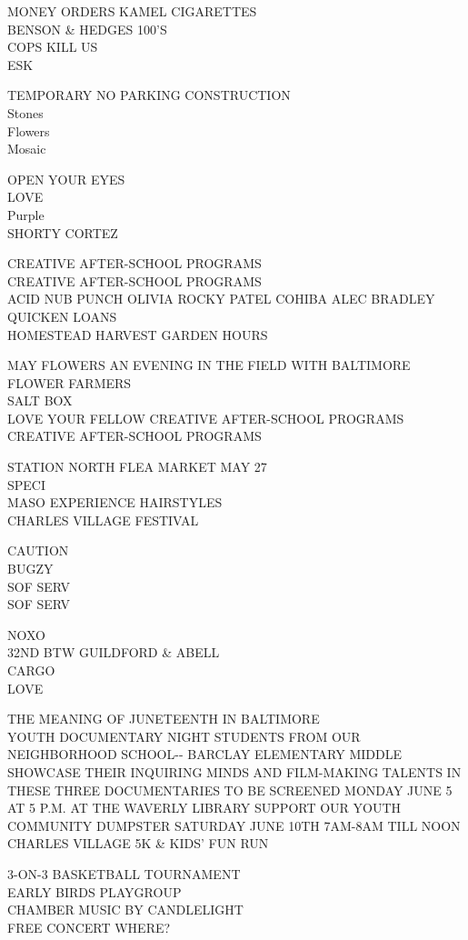 \documentclass[10pt,letterpaper]{article}
\begin{document}
MONEY ORDERS KAMEL CIGARETTES\\
BENSON \& HEDGES 100'S\\
COPS KILL US\\
ESK

TEMPORARY NO PARKING CONSTRUCTION\\
Stones\\
Flowers\\
Mosaic

OPEN YOUR EYES\\
LOVE\\
Purple\\
SHORTY CORTEZ

CREATIVE AFTER{-}SCHOOL PROGRAMS\\
CREATIVE AFTER{-}SCHOOL PROGRAMS\\
ACID NUB PUNCH OLIVIA ROCKY PATEL COHIBA ALEC BRADLEY QUICKEN LOANS\\
HOMESTEAD HARVEST GARDEN HOURS

MAY FLOWERS AN EVENING IN THE FIELD WITH BALTIMORE FLOWER FARMERS\\
SALT BOX\\
LOVE YOUR FELLOW CREATIVE AFTER{-}SCHOOL PROGRAMS\\
CREATIVE AFTER{-}SCHOOL PROGRAMS

STATION NORTH FLEA MARKET MAY 27\\
SPECI\\
MASO EXPERIENCE HAIRSTYLES\\
CHARLES VILLAGE FESTIVAL

CAUTION\\
BUGZY\\
SOF SERV\\
SOF SERV

NOXO\\
32ND BTW GUILDFORD \& ABELL\\
CARGO\\
LOVE

THE MEANING OF JUNETEENTH IN BALTIMORE\\
YOUTH DOCUMENTARY NIGHT STUDENTS FROM OUR NEIGHBORHOOD SCHOOL{-}{-} BARCLAY ELEMENTARY MIDDLE  SHOWCASE THEIR INQUIRING MINDS AND FILM{-}MAKING TALENTS IN THESE THREE DOCUMENTARIES TO BE SCREENED MONDAY JUNE 5 AT 5 P.M. AT THE WAVERLY LIBRARY SUPPORT OUR YOUTH\\
COMMUNITY DUMPSTER SATURDAY JUNE 10TH 7AM{-}8AM TILL NOON\\
CHARLES VILLAGE 5K \& KIDS' FUN RUN

3{-}ON{-}3 BASKETBALL TOURNAMENT\\
EARLY BIRDS PLAYGROUP\\
CHAMBER MUSIC BY CANDLELIGHT\\
FREE CONCERT WHERE?
\end{document}
